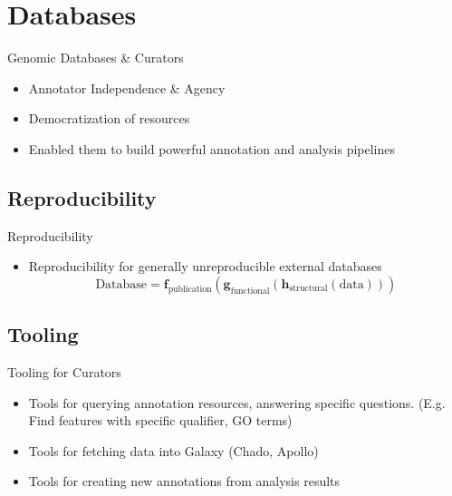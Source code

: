 \documentclass[12pt]{phage3slides} %
\begin{document}
\section{Databases}

\begin{frame}{Genomic Databases \& Curators}
    \begin{itemize}
        \item Annotator Independence \& Agency
        \item Democratization of resources%
        \item Enabled them to build powerful annotation and analysis pipelines
    \end{itemize}
\end{frame}

\subsection{Reproducibility}
\begin{frame}{Reproducibility}
    \begin{itemize}
        \item Reproducibility for generally unreproducible external databases\\
            \begin{equation*}
                \text{Database} = %
                    \textbf{f}_{\text{publication}}(%
                    \textbf{g}_{\text{functional}}(%
                    \textbf{h}_{\text{structural}}(%
                    \text{data}%
                    )))
            \end{equation*}
    \end{itemize}
\end{frame}

\subsection{Tooling}
\begin{frame}{Tooling for Curators}
    \begin{itemize}
        \item Tools for querying annotation resources, answering specific questions. (E.g. Find features with specific qualifier, GO terms)
        \item Tools for fetching data into Galaxy (Chado, Apollo)
        \item Tools for creating new annotations from analysis results
    \end{itemize}
\end{frame}
\end{document}
